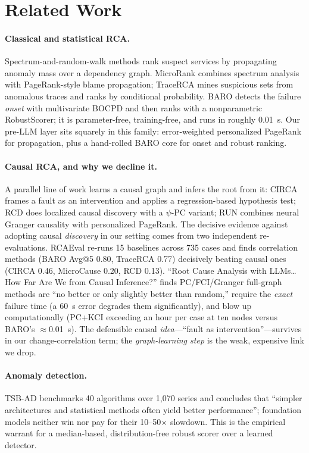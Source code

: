 \documentclass[11pt]{article}
\begin{document}
\section{Related Work}

\paragraph{Classical and statistical RCA.}
Spectrum-and-random-walk methods rank suspect services by propagating anomaly
mass over a dependency graph. MicroRank \citep{microrank} combines spectrum
analysis with PageRank-style blame propagation; TraceRCA \citep{tracerca} mines
suspicious sets from anomalous traces and ranks by conditional probability. BARO
\citep{baro} detects the failure \emph{onset} with multivariate BOCPD and then
ranks with a nonparametric RobustScorer; it is parameter-free, training-free, and
runs in roughly 0.01~s. Our pre-LLM layer sits squarely in this family:
error-weighted personalized PageRank for propagation, plus a hand-rolled BARO core
for onset and robust ranking.

\paragraph{Causal RCA, and why we decline it.}
A parallel line of work learns a causal graph and infers the root from it: CIRCA
\citep{circa} frames a fault as an intervention and applies a regression-based
hypothesis test; RCD \citep{rcd} does localized causal discovery with a $\psi$-PC
variant; RUN \citep{run} combines neural Granger causality with personalized
PageRank. The decisive evidence against adopting causal \emph{discovery} in our
setting comes from two independent re-evaluations. RCAEval \citep{rcaeval} re-runs
15 baselines across 735 cases and finds correlation methods (BARO Avg@5 0.80,
TraceRCA 0.77) decisively beating causal ones (CIRCA 0.46, MicroCause 0.20, RCD
0.13). ``Root Cause Analysis with LLMs\ldots How Far Are We from Causal
Inference?'' \citep{zhang2024causal} finds PC/FCI/Granger full-graph methods are
``no better or only slightly better than random,'' require the \emph{exact}
failure time (a 60~s error degrades them significantly), and blow up
computationally (PC+KCI exceeding an hour per case at ten nodes versus BARO's
$\approx$0.01~s). The defensible causal \emph{idea}---``fault as
intervention''---survives in our change-correlation term; the
\emph{graph-learning step} is the weak, expensive link we drop.

\paragraph{Anomaly detection.}
TSB-AD \citep{tsbad} benchmarks 40 algorithms over 1{,}070 series and concludes
that ``simpler architectures and statistical methods often yield better
performance''; foundation models neither win nor pay for their 10--50$\times$
slowdown. This is the empirical warrant for a median-based, distribution-free
robust scorer over a learned detector.
\end{document}
